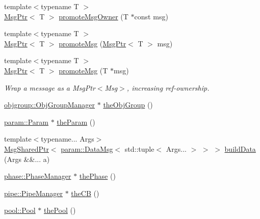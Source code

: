 \begin{DoxyCompactItemize}
{\footnotesize template$<$typename T $>$ }\\\hyperlink{namespacevt_a9f5ebd62ee9d6dd8829e3e1cc4f858e9}{Msg\+Ptr}$<$ T $>$ \hyperlink{namespacevt_a67418c428a6a98bdc05c264ef8517dd4}{promote\+Msg\+Owner} (T $\ast$const msg)
\item 
{\footnotesize template$<$typename T $>$ }\\\hyperlink{namespacevt_a9f5ebd62ee9d6dd8829e3e1cc4f858e9}{Msg\+Ptr}$<$ T $>$ \hyperlink{namespacevt_af00ebdeb74801e5658cf5726193d5753}{promote\+Msg} (\hyperlink{namespacevt_a9f5ebd62ee9d6dd8829e3e1cc4f858e9}{Msg\+Ptr}$<$ T $>$ msg)
\item 
{\footnotesize template$<$typename T $>$ }\\\hyperlink{namespacevt_a9f5ebd62ee9d6dd8829e3e1cc4f858e9}{Msg\+Ptr}$<$ T $>$ \hyperlink{namespacevt_a991383de8a150393ef67012fbe689dd0}{promote\+Msg} (T $\ast$msg)
\begin{DoxyCompactList}\small\item\em Wrap a message as a Msg\+Ptr$<$\+Msg$>$, increasing ref-\/ownership. \end{DoxyCompactList}\item 
\hyperlink{structvt_1_1objgroup_1_1_obj_group_manager}{objgroup\+::\+Obj\+Group\+Manager} $\ast$ \hyperlink{namespacevt_a833f0115b692f578167cbd88e30d39c5}{the\+Obj\+Group} ()
\item 
\hyperlink{structvt_1_1param_1_1_param}{param\+::\+Param} $\ast$ \hyperlink{namespacevt_a268431014c9031c0f7c33d32c1b8645c}{the\+Param} ()
\item 
{\footnotesize template$<$typename... Args$>$ }\\\hyperlink{namespacevt_ab2b3d506ec8e8d1540aede826d84a239}{Msg\+Shared\+Ptr}$<$ \hyperlink{structvt_1_1param_1_1_data_msg}{param\+::\+Data\+Msg}$<$ std\+::tuple$<$ Args... $>$ $>$ $>$ \hyperlink{namespacevt_a59494f92a4811ae4f2b5264a50aa78dd}{build\+Data} (Args \&\&... a)
\item 
\hyperlink{structvt_1_1phase_1_1_phase_manager}{phase\+::\+Phase\+Manager} $\ast$ \hyperlink{namespacevt_a3799d6b51fb71d7b6505760aad457e61}{the\+Phase} ()
\item 
\hyperlink{structvt_1_1pipe_1_1_pipe_manager}{pipe\+::\+Pipe\+Manager} $\ast$ \hyperlink{namespacevt_a673b109e94c7bca58313504c83e1da94}{the\+CB} ()
\item 
\hyperlink{structvt_1_1pool_1_1_pool}{pool\+::\+Pool} $\ast$ \hyperlink{namespacevt_aab3530d89a64e5ea903b0ccf303ecbb7}{the\+Pool} ()
\item 

\end{DoxyCompactItemize}
